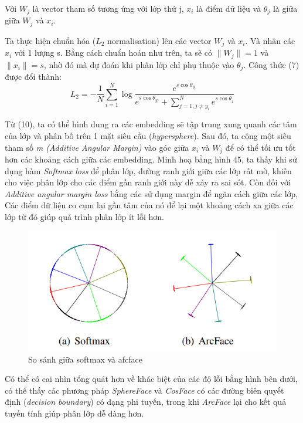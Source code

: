 \documentclass[a4paper, 12pt]{article}
\begin{document}
Với $W_j$ là vector tham số tương ứng với lớp thứ j, $x_i$ là điểm dữ liệu và $\theta_j$ là giữa giữa $W_j$ và $x_i$.  

Ta thực hiện chuẩn hóa ($L_2$ normalisation) lên các vector $W_j$ và $x_i$. Và nhân các $x_i$ với 1 lượng s. Bằng cách chuẩn hoán như trên, ta sẽ có $\|W_j\|=1$ và $\|x_i\|=s$, nhờ đó mà dự đoán khi phân lớp chỉ phụ thuộc vào $\theta_j$. Công thức (7) được đổi thành:  
\begin{equation}
L_2=-\frac{1}{N}\sum_{i=1}^{N}{\log{\frac{e^{s\cos{\theta_{y_i}}}}{e^{s\cos{\theta_{y_i}}} + \sum_{j=1,j\neq y_i}^{N}{e^{s\cos{\theta_{j}}}}}}}
\end{equation}

Từ (10), ta có thể hình dung ra các embedding sẽ tập trung xung quanh các tâm của lớp và phân bố trên 1 mặt siêu cầu (\textit{hypersphere}). Sau đó, ta cộng một siêu tham số \textit{m (Additive Angular Margin)} vào góc giữa $x_i$ và $W_j$ để có thể tối ưu tốt hơn các khoảng cách giữa các embedding. Minh hoạ bằng hình 45, ta thấy khi sử dụng hàm \textit{Softmax loss} để phân lớp, đường ranh giới giữa các lớp rất mờ, khiến cho việc phân lớp cho các điểm gần ranh giới này dễ xảy ra sai sót. Còn đối với \textit{Additive angular margin loss} bằng các sử dụng margin để ngăn cách giữa các lớp, Các điểm dữ liệu co cụm lại gần tâm của nó để  lại một khoảng cách xa giữa các lớp từ đó giúp quá trình phân lớp ít lỗi hơn.

\begin{figure}[H]
    \begin{center}
        \includegraphics[scale=0.5]{img/softmax-vs-arcface}
        \caption{So sánh giữa softmax và afcface}
    \end{center}
\end{figure}

Có thể có cai nhìn tổng quát hơn về khác biệt của các độ lỗi bằng hình bên dưới, có thể thấy các phương pháp \textit{SphereFace} và \textit{CosFace} có các đường biên quyết định (\textit{decision boundary}) có dạng phi tuyến, trong khi \textit{ArcFace} lại cho kết quả tuyến tính giúp phân lớp dễ dàng hơn.  
\end{document}
